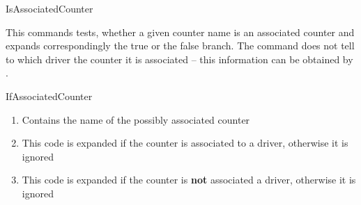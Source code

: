 \documentclass[12pt,paper=a4]{article}
\begin{document}
\begin{docCommand}{IsAssociatedCounter}{}%

This commands tests, whether a given counter name is an associated counter and expands correspondingly the true or the false branch. The command does not tell to which driver the counter it is associated -- this information can be obtained by . 

\begin{docCommandArgs}{IfAssociatedCounter}%

\begin{enumerate}[label={\textcolor{blue}{\#\arabic*}}]
\item {}%

  Contains the name of the possibly associated counter

\item {}

  This code is expanded if the counter is associated to a driver, otherwise it is ignored

\item {}

  This code is expanded if the counter is \textbf{not} associated a  driver, otherwise it is ignored

\end{enumerate}
\end{docCommandArgs}


\begin{dispExample}
\end{dispExample}

\end{docCommand}%
\end{document}
